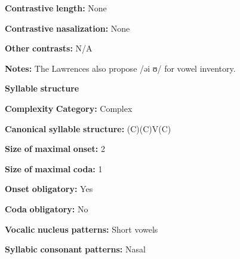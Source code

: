 \documentclass[output=paper]{langsci/langscibook}
\begin{document}
\begin{styleBody}
\textbf{Contrastive} \textbf{length:} None
\end{styleBody}

\begin{styleBody}
\textbf{Contrastive} \textbf{nasalization:} None
\end{styleBody}

\begin{styleBody}
\textbf{Other} \textbf{contrasts:} N/A
\end{styleBody}

\begin{styleBody}
\textbf{Notes:} The Lawrences also propose /əi ʊ/ for vowel inventory.
\end{styleBody}

\begin{styleBody}
\textbf{Syllable} \textbf{structure}
\end{styleBody}

\begin{styleBody}
\textbf{Complexity} \textbf{Category:} Complex
\end{styleBody}

\begin{styleBody}
\textbf{Canonical} \textbf{syllable} \textbf{structure:} (C)(C)V(C) \citep[63-73]{Loughnane2009}
\end{styleBody}

\begin{styleBody}
\textbf{Size} \textbf{of} \textbf{maximal} \textbf{onset:} 2
\end{styleBody}

\begin{styleBody}
\textbf{Size} \textbf{of} \textbf{maximal} \textbf{coda:} 1
\end{styleBody}

\begin{styleBody}
\textbf{Onset} \textbf{obligatory:} Yes
\end{styleBody}

\begin{styleBody}
\textbf{Coda} \textbf{obligatory:} No
\end{styleBody}

\begin{styleBody}
\textbf{Vocalic} \textbf{nucleus} \textbf{patterns:} Short vowels
\end{styleBody}

\begin{styleBody}
\textbf{Syllabic} \textbf{consonant} \textbf{patterns:} Nasal
\end{styleBody}
\end{document}
